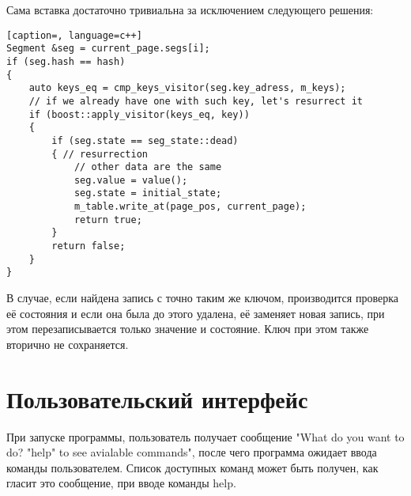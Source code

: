 \documentclass[12pt, a4paper]{fallen_report}
\begin{document}
Сама вставка достаточно тривиальна за исключением следующего решения: 
\begin{lstlisting}[caption=, language=c++]
Segment &seg = current_page.segs[i];
if (seg.hash == hash) 
{
    auto keys_eq = cmp_keys_visitor(seg.key_adress, m_keys);
    // if we already have one with such key, let's resurrect it
    if (boost::apply_visitor(keys_eq, key)) 
    {
        if (seg.state == seg_state::dead) 
        { // resurrection
            // other data are the same
            seg.value = value();
            seg.state = initial_state;
            m_table.write_at(page_pos, current_page);
            return true;
        }
        return false;
    }
}
\end{lstlisting}
В случае, если найдена запись с точно таким же ключом, производится проверка её состояния и если она была до этого удалена, её заменяет новая запись, при этом перезаписывается только значение и состояние. Ключ при этом также вторично не сохраняется.

\pagebreak
\section{Пользовательский интерфейс}
При запуске программы, пользователь получает сообщение {\consolas "What do you want to do? "help" to see avialable commands"}, после чего программа ожидает ввода команды пользователем. Список доступных команд может быть получен, как гласит это сообщение, при вводе команды {\consolas help}.
\end{document}
